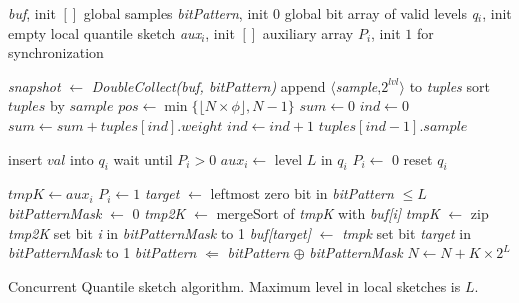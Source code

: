 \begin{algorithm*}[tb]
\small
\begin{multicols}{2}
\begin{algorithmic}[1]

\Vars
\State \emph{buf}, init $[ ]$ \Comment global samples
\State \emph{bitPattern}, init 0 \Comment global bit array of valid levels
\Statex
{}
	\State \emph{q$_i$}, init empty \Comment local quantile sketch
	\State \emph{aux$_i$}, init $[ ]$ \Comment auxiliary array
	 $P_i$, init $1$ \Comment for synchronization
\EndFor
\EndFor

\Statex
{}
\State \emph{snapshot} $\leftarrow$ \emph{DoubleCollect(buf, bitPattern)}
 \label{l:caught-snapshot}
		\State append $\langle$\emph{sample},\emph{$2^{lvl}$}$\rangle$ to \emph{tuples}
	\EndFor
\EndFor
\State sort $tuples$ by $sample$
\State $pos \leftarrow \min {\{\lfloor N \times \phi \rfloor, N-1\}}$
\State $sum \leftarrow 0$
\State $ind \leftarrow 0$
	\State $sum \leftarrow sum + tuples[ind].weight$
	\State $ind \leftarrow ind + 1$
\EndWhile
\State \Return $tuples[ind-1].sample$ 
\EndProcedure

\State insert $val$ into $q_i$
		\State wait until $P_i>0$
		\State $aux_i \leftarrow$ level $L$ in $q_i$
		\State $P_i \leftarrow$ 0
		\State reset $q_i$
\EndIf
\EndProcedure

		\State $tmpK \leftarrow aux_i$
		\State $P_i \leftarrow 1$
		\State \emph{target} $\leftarrow$ leftmost zero bit in \emph{bitPattern} $\leq L$
		\State \emph{bitPatternMask} $\leftarrow$ 0
				\State \emph{tmp2K} $\leftarrow$ mergeSort of \emph{tmpK} with \emph{buf[i]}
				\State \emph{tmpK} $\leftarrow$ zip \emph{tmp2K} \label{l:zip}
				\State set bit \emph{i} in \emph{bitPatternMask} to 1
		\EndFor
		\State \emph{buf[target]} $\leftarrow$ \emph{tmpk}
		\State set bit \emph{target} in \emph{bitPatternMask} to 1
		\State \emph{bitPattern} $\Leftarrow$ \emph{bitPattern} $\oplus$ \emph{bitPatternMask}
		\State $N \leftarrow N + K \times 2^{L}$
\EndFor
\EndWhile
\EndProcedure

\end{algorithmic}
\end{multicols}
\caption{Concurrent Quantile sketch algorithm. Maximum level in local sketches is $L$.}
\label{alg:concurrent-quantile}
\end{algorithm*}


